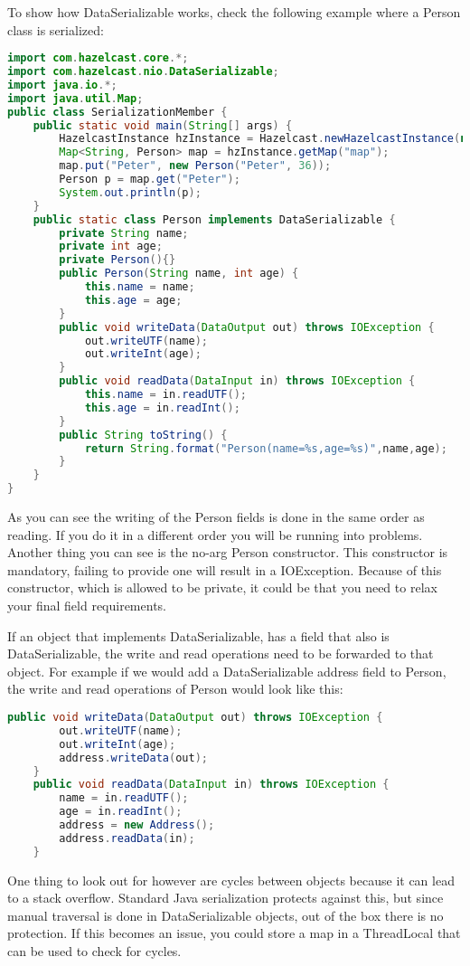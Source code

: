To show how DataSerializable works, check the following example where a Person class is serialized:
\begin{lstlisting}[language=java]
import com.hazelcast.core.*;
import com.hazelcast.nio.DataSerializable;
import java.io.*;
import java.util.Map;
public class SerializationMember {
    public static void main(String[] args) {
        HazelcastInstance hzInstance = Hazelcast.newHazelcastInstance(null);
        Map<String, Person> map = hzInstance.getMap("map");
        map.put("Peter", new Person("Peter", 36));
        Person p = map.get("Peter");
        System.out.println(p);
    }
    public static class Person implements DataSerializable {
        private String name;
        private int age;
        private Person(){}
        public Person(String name, int age) {
            this.name = name;
            this.age = age;
        }
        public void writeData(DataOutput out) throws IOException {
            out.writeUTF(name);
            out.writeInt(age);
        }
        public void readData(DataInput in) throws IOException {
            this.name = in.readUTF();
            this.age = in.readInt();
        }
        public String toString() {
            return String.format("Person(name=%s,age=%s)",name,age);
        }
    }
}
\end{lstlisting}
As you can see the writing of the Person fields is done in the same order as reading. If you do it in a different order you will be running into problems. Another thing you can see is the no-arg Person constructor. This constructor is mandatory, failing to provide one will result in a IOException. Because of this constructor, which is allowed to be private, it could be that you need to relax your final field requirements.

If an object that implements DataSerializable, has a field that also is DataSerializable, the write and read operations need to be forwarded to that object. For example if we would add a DataSerializable address field to Person, the write and read operations of Person would look like this:
\begin{lstlisting}[language=java]
    public void writeData(DataOutput out) throws IOException {
        out.writeUTF(name);
        out.writeInt(age);
        address.writeData(out);
    }
    public void readData(DataInput in) throws IOException {
        name = in.readUTF();
        age = in.readInt();
        address = new Address();
        address.readData(in);
    }
\end{lstlisting}
One thing to look out for however are cycles between objects because it can lead to a stack overflow. Standard Java serialization protects against this, but since manual traversal is done in DataSerializable objects, out of the box there is no protection. If this becomes an issue, you could store a map in a ThreadLocal that can be used to check for cycles.

